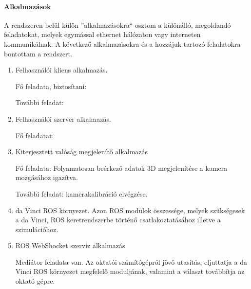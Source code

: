 \documentclass[12pt,a4paper,oneside]{report} %
\begin{document}
\paragraph{Alkalmazások}
A rendszeren belül külön ''alkalmazásokra`` osztom a különálló, megoldandó feladatokat, melyek egymással ethernet hálózaton vagy interneten kommunikálnak.
A következő alkalmazásokra és a hozzájuk  tartozó feladatokra bontottam a rendszert.
\begin{enumerate}
	\item Felhasználói kliens alkalmazás.
	\par Fő feladata, biztosítani: 
	\par További feladat:

	
	\item Felhasználói szerver alkalmazás.
	\par Fő feladatai:

	\item Kiterjesztett valóság megjelenítő alkalmazás
	\par Fő feladata: Folyamatosan beérkező adatok 3D megjelenítése a kamera mozgásához igazítva.
	\par További feladat: kamerakalibráció elvégzése.

	\item da Vinci ROS környezet. Azon ROS modulok összessége, melyek szükségesek a da Vinci, ROS keretrendszerbe történő csatlakoztatásához illetve a szimulációhoz.
	
	\item ROS WebShocket szerviz alkalmazás
	\par Mediátor feladata van. Az oktatói számítógépről jövő utasítás, eljuttatja  a da Vinci ROS környezet megfelelő moduljának, valamint a választ továbbítja az oktató gépre.
\end{enumerate}
\end{document}
